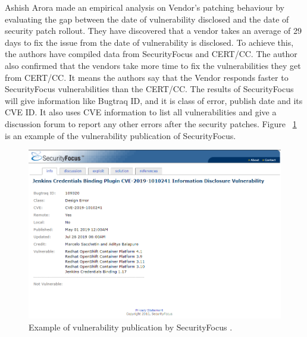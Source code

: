 Ashish Arora \cite{AsRaRaYu2006} made an empirical analysis on Vendor’s patching behaviour by evaluating the gap between the date of vulnerability disclosed and the date of security patch rollout. They have discovered that a vendor takes an average of 29 days to fix the issue from the date of vulnerability is disclosed. To achieve this, the authors have compiled data from SecurityFocus and CERT/CC. The author also confirmed that the vendors take more time to fix the vulnerabilities they get from CERT/CC. It means the authors say that the Vendor responds faster to SecurityFocus vulnerabilities than the CERT/CC. The results of SecurityFocus will give information like Bugtraq ID, and it is class of error, publish date and its \acs{CVE} ID. It also uses \acs{CVE} information to list all vulnerabilities and give a discussion forum to report any other errors after the security patches. Figure ~\ref{fig:securityFocus} is an example of the vulnerability publication of SecurityFocus.
\newpage
\begin{figure}[h!]
	\includegraphics[width=15cm]{includes/securityFocus.png}
	\centering
	\caption{Example of vulnerability publication by SecurityFocus \cite{SecurityFocus}.}
	\label{fig:securityFocus}
\end{figure}

